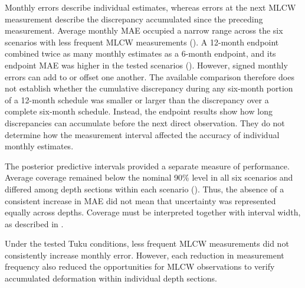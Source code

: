 Monthly errors describe individual estimates, whereas errors at the next MLCW measurement describe the discrepancy accumulated since the preceding measurement. Average monthly MAE occupied a narrow range across the six scenarios with less frequent MLCW measurements (). A 12-month endpoint combined twice as many monthly estimates as a 6-month endpoint, and its endpoint MAE was higher in the tested scenarios (). However, signed monthly errors can add to or offset one another. The available comparison therefore does not establish whether the cumulative discrepancy during any six-month portion of a 12-month schedule was smaller or larger than the discrepancy over a complete six-month schedule. Instead, the endpoint results show how long discrepancies can accumulate before the next direct observation. They do not determine how the measurement interval affected the accuracy of individual monthly estimates.

The posterior predictive intervals provided a separate measure of performance. Average coverage remained below the nominal 90\% level in all six scenarios and differed among depth sections within each scenario (). Thus, the absence of a consistent increase in MAE did not mean that uncertainty was represented equally across depths. Coverage must be interpreted together with interval width, as described in .

Under the tested Tuku conditions, less frequent MLCW measurements did not consistently increase monthly error. However, each reduction in measurement frequency also reduced the opportunities for MLCW observations to verify accumulated deformation within individual depth sections.

